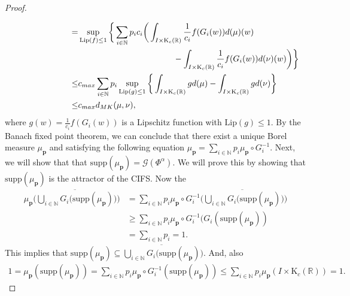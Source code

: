\documentclass[12pt,oneside,reqno]{amsart}
\theoremstyle{definition}
\theoremstyle{remark}
\begin{document}
\begin{proof}
\begin{equation*}
\begin{aligned}
               \end{aligned}
          \end{equation*}
               \begin{equation*}
              \begin{aligned}
             \hspace{2.5cm}
          =& \sup_{\text{Lip}(f)\leq1}\bigg\{\sum_{i\in \mathbb{N}}p_{i} c_i \bigg(\int_{I\times \mathrm{K}_c(\mathbb{R})}\frac{1}{c_i}f(G_i(w))d(\mu)(w) \\& \hspace{4cm} -\int_{I\times \mathrm{K}_c(\mathbb{R})}\frac{1}{c_i}f(G_i(w))d(\nu)(w)\bigg)\bigg\}\\ 
            \le &  c_{max} \sum_{i\in \mathbb{N}}p_{i} \sup_{\text{Lip}(g)\leq1}\bigg\{ \int_{I\times \mathrm{K}_c(\mathbb{R})}gd(\mu)-\int_{I\times \mathrm{K}_c(\mathbb{R})}gd(\nu)\bigg\}\\\le& c_{max} d_{MK}(\mu,\nu),
              \end{aligned}
          \end{equation*}
where $g(w)=\frac{1}{c_i}f(G_i(w))$ is a Lipschitz function with $\text{Lip}(g)\leq1$. By the Banach fixed point theorem, we can conclude that there exist a unique Borel measure $\mu_{\boldsymbol{p}}$ and satisfying the following equation $\mu_{\boldsymbol{p}}=\sum_{i \in\mathbb{N}}p_{i}\mu_{\boldsymbol{p}}\circ G_{i}^{-1}.$
Next, we will show that that $\text{supp}(\mu_{\boldsymbol{p}})= \mathcal{G}(\Phi^\alpha).$ We will prove this by showing that $\text{supp}(\mu_{\boldsymbol{p}})$ is the attractor of the CIFS. Now the
\begin{align*}
\mu_{\boldsymbol{p}}\bigg(\overline{\bigcup_{i
  \in \mathbb{N}}G_i(\text{supp}(\mu_{\boldsymbol{p}})})\bigg)&=\sum_{i\in\mathbb{N}}p_{i}\mu_{\boldsymbol{p}}\circ G_i^{-1} \bigg(\overline{\bigcup_{i
  \in \mathbb{N}}G_i(\text{supp}(\mu_{\boldsymbol{p}})})\bigg)\\&\geq \sum_{i\in\mathbb{N}}p_{i}\mu_{\boldsymbol{p}}\circ G_i^{-1}(G_i(\text{supp}(\mu_{\boldsymbol{p}}))\\&=\sum_{i\in\mathbb{N}}p_{i}=1.
\end{align*}
This implies that $\text{supp} (\mu_{\boldsymbol{p}})\subseteq \overline{\bigcup_{i
  \in \mathbb{N}}G_i(\text{supp}(\mu_{\boldsymbol{p}})}).$ And, also
  \begin{align*}
 1=\mu_{\boldsymbol{p}}(\text{supp}(\mu_{\boldsymbol{p}}))= \sum_{i\in\mathbb{N}}p_{i}\mu_{\boldsymbol{p}}\circ G_i^{-1} (\text{supp}(\mu_{\boldsymbol{p}}))\leq \sum_{i\in\mathbb{N}}p_{i}\mu_{\boldsymbol{p}}(I\times \mathrm{K}_c(\mathbb{R}))=1.  

\end{align*}
\end{proof}
\end{document}
